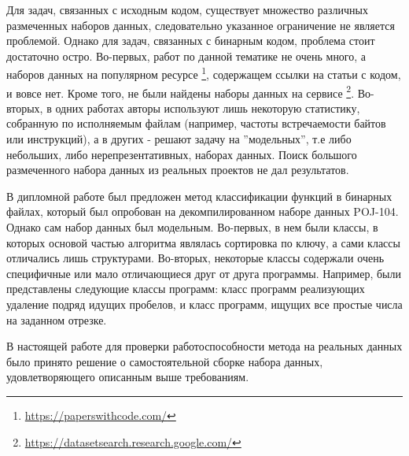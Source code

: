 Для задач, связанных с исходным кодом, существует множество различных размеченных наборов данных, следовательно указанное ограничение не является проблемой. Однако для задач, связанных с бинарным кодом, проблема стоит достаточно остро. Во-первых, работ по данной тематике не очень много, а наборов данных на популярном ресурсе \footnote{\url{https://paperswithcode.com/}}, содержащем ссылки на статьи с кодом, и вовсе нет. Кроме того, не были найдены наборы данных на сервисе \footnote{\url{https://datasetsearch.research.google.com/}}. Во-вторых, в одних работах авторы используют лишь некоторую статистику, собранную по исполняемым файлам (например, частоты встречаемости байтов или инструкций), а в других - решают задачу на ''модельных'', т.е либо небольших, либо нерепрезентативных, наборах данных. Поиск большого размеченного набора данных из реальных проектов не дал результатов.

В дипломной работе был предложен метод классификации функций в бинарных файлах, который был опробован на декомпилированном наборе данных POJ-104\cite{DBLP:journals/corr/MouLJZW14}. Однако сам набор данных был модельным. Во-первых, в нем были классы, в которых основой частью алгоритма являлась сортировка по ключу, а сами классы отличались лишь структурами. Во-вторых, некоторые классы содержали очень специфичные или мало отличающиеся друг от друга программы. Например, были представлены следующие классы программ: класс программ реализующих удаление подряд идущих пробелов, и класс программ, ищущих все простые числа на заданном отрезке.

В настоящей работе для проверки работоспособности метода на реальных данных было принято решение о самостоятельной сборке набора данных, удовлетворяющего описанным выше требованиям.